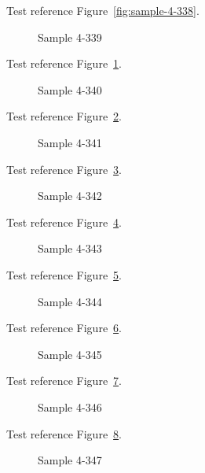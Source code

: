 Test reference Figure~\ref{fig:sample-4-338}.

\begin{figure}[tbhp]
\caption{Sample 4-339}
\label{fig:sample-4-339}
\end{figure}

Test reference Figure~\ref{fig:sample-4-339}.

\begin{figure}[tbhp]
\caption{Sample 4-340}
\label{fig:sample-4-340}
\end{figure}

Test reference Figure~\ref{fig:sample-4-340}.

\begin{figure}[tbhp]
\caption{Sample 4-341}
\label{fig:sample-4-341}
\end{figure}

Test reference Figure~\ref{fig:sample-4-341}.

\begin{figure}[tbhp]
\caption{Sample 4-342}
\label{fig:sample-4-342}
\end{figure}

Test reference Figure~\ref{fig:sample-4-342}.

\begin{figure}[tbhp]
\caption{Sample 4-343}
\label{fig:sample-4-343}
\end{figure}

Test reference Figure~\ref{fig:sample-4-343}.

\begin{figure}[tbhp]
\caption{Sample 4-344}
\label{fig:sample-4-344}
\end{figure}

Test reference Figure~\ref{fig:sample-4-344}.

\begin{figure}[tbhp]
\caption{Sample 4-345}
\label{fig:sample-4-345}
\end{figure}

Test reference Figure~\ref{fig:sample-4-345}.

\begin{figure}[tbhp]
\caption{Sample 4-346}
\label{fig:sample-4-346}
\end{figure}

Test reference Figure~\ref{fig:sample-4-346}.

\begin{figure}[tbhp]
\caption{Sample 4-347}
\label{fig:sample-4-347}
\end{figure}

